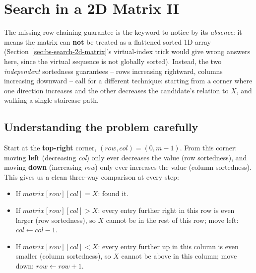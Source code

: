 \section{Search in a 2D Matrix II}
\label{sec:bs-search-2d-matrix-2}


\begin{patternbox}
The missing row-chaining guarantee is the keyword to notice by its
\emph{absence}: it means the matrix can \textbf{not} be treated as a
flattened sorted 1D array (Section~\ref{sec:bs-search-2d-matrix}'s
virtual-index trick would give wrong answers here, since the virtual
sequence is not globally sorted). Instead, the two \emph{independent}
sortedness guarantees -- rows increasing rightward, columns increasing
downward -- call for a different technique: starting from a corner where
one direction increases and the other decreases the candidate's relation
to $X$, and walking a single staircase path.
\end{patternbox}

\subsection*{Understanding the problem carefully}

Start at the \textbf{top-right} corner, $(\textit{row}, \textit{col}) =
(0, m-1)$. From this corner: moving \textbf{left} (decreasing
\textit{col}) only ever decreases the value (row sortedness), and moving
\textbf{down} (increasing \textit{row}) only ever increases the value
(column sortedness). This gives us a clean three-way comparison at every
step:

\begin{itemize}
  \item If $\textit{matrix}[\textit{row}][\textit{col}] = X$: found it.
  \item If $\textit{matrix}[\textit{row}][\textit{col}] > X$: every entry
        further right in this row is even larger (row sortedness), so $X$
        cannot be in the rest of this row; move left:
        $\textit{col} \gets \textit{col}-1$.
  \item If $\textit{matrix}[\textit{row}][\textit{col}] < X$: every entry
        further up in this column is even smaller (column sortedness), so
        $X$ cannot be above in this column; move down:
        $\textit{row} \gets \textit{row}+1$.
\end{itemize}

